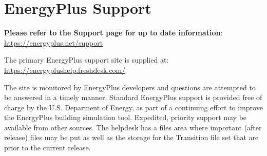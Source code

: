 \section{EnergyPlus Support}\label{energyplus-support}

\textbf{Please refer to the Support page for up to date information}: \url{https://energyplus.net/support}

The primary EnergyPlus support site is supplied at: \url{https://energyplushelp.freshdesk.com/}

The site is monitored by EnergyPlus developers and questions are attempted to be answered in a timely manner. Standard EnergyPlus support is provided free of charge by the U.S. Deparment of Energy, as part of a continuing effort to improve the EnergyPlus building simulation tool. Expedited, priority support may be available from other sources. The helpdesk has a files area where important (after release) files may be put as well as the storage for the Transition file set that are prior to the current release.
